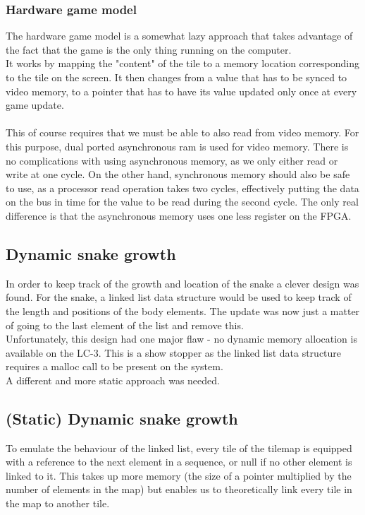 \documentclass{acm_proc_article-sp}
\begin{document}
\subsubsection{Hardware game model}
The hardware game model is a somewhat lazy approach that takes advantage of the fact that the game is the only thing running on the computer.\\
It works by mapping the "content" of the tile to a memory location corresponding to the tile on the screen. It then changes from a value that has to be synced to video memory, to a pointer that has to have its value updated only once at every game update.\\\\
This of course requires that we must be able to also read from video memory. For this purpose, dual ported asynchronous ram\cite{chu2008fpga} is used for video memory. There is no complications with using asynchronous memory, as we only either read or write at one cycle. On the other hand, synchronous memory should also be safe to use, as a processor read operation takes two cycles, effectively putting the data on the bus in time for the value to be read during the second cycle. The only real difference is that the asynchronous memory uses one less register on the FPGA.


\subsection{Dynamic snake growth}
In order to keep track of the growth and location of the snake a clever design was found. For the snake, a linked list data structure would be used to keep track of the length and positions of the body elements. The update was now just a matter of going to the last element of the list and remove this.\\
Unfortunately, this design had one major flaw - no dynamic memory allocation is available on the LC-3. This is a show stopper as the linked list data structure requires a malloc call to be present on the system.\\
A different and more static approach was needed.
\subsection{(Static) Dynamic snake growth}
To emulate the behaviour of the linked list, every tile of the tilemap is equipped with a reference to the next element in a sequence, or null if no other element is linked to it. This takes up more memory (the size of a pointer multiplied by the number of elements in the map) but enables us to theoretically link every tile in the map to another tile.
\end{document}
